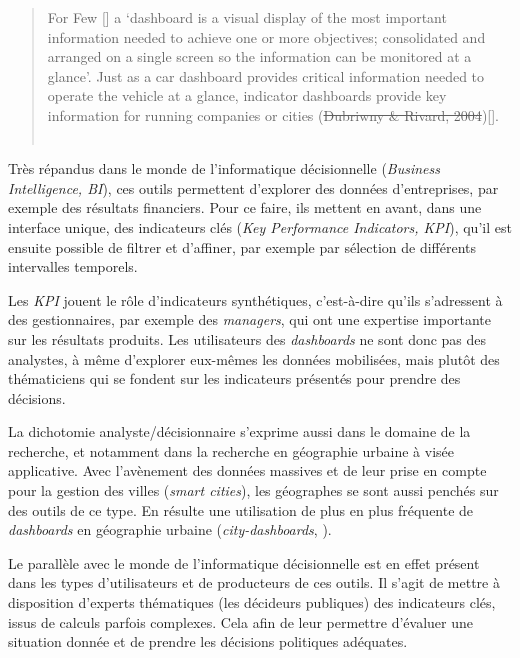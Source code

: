 	\begin{quotation}
		\og For Few [\autocite[p.34]{few_information_2006}] a ‘dashboard is
		a visual display of the most important information needed to achieve one or more objectives; consolidated and arranged on a single screen so the information can be monitored at a glance’.
		Just as a car dashboard provides critical information needed to operate the vehicle at a glance, indicator dashboards provide key information for running companies or cities (\st{Dubriwny \& Rivard, 2004})[\autocite{rivard_are_2004}].\fg{}\\
		\mbox{}~ \hfill \cite[p. 11]{kitchin_knowing_2015}
	\end{quotation}

	Très répandus dans le monde de l'informatique décisionnelle (\textit{Business Intelligence, BI}), ces outils permettent d'explorer des données d'entreprises, par exemple des résultats financiers.
	Pour ce faire, ils mettent en avant, dans une interface unique, des indicateurs clés (\textit{Key Performance Indicators, KPI}), qu'il est ensuite possible de filtrer et d'affiner, par exemple par sélection de différents intervalles temporels.

	Les \textit{KPI} jouent le rôle d'indicateurs synthétiques, c'est-à-dire qu'ils s'adressent à des gestionnaires, par exemple des \textit{managers}, qui ont une expertise importante sur les résultats produits.
	Les utilisateurs des \textit{dashboards} ne sont donc pas des analystes, à même d'explorer eux-mêmes les données mobilisées, mais plutôt des thématiciens qui se fondent sur les indicateurs présentés pour prendre des décisions.

	La dichotomie \og analyste/décisionnaire\fg{} s'exprime aussi dans le domaine de la recherche, et notamment dans la recherche en géographie urbaine à visée applicative.
	Avec l'avènement des données massives et de leur prise en compte pour la gestion des villes (\textit{smart cities}), les géographes se sont aussi penchés sur des outils de ce type.
	En résulte une utilisation de plus en plus fréquente de \textit{dashboards} en géographie urbaine (\og \textit{city-dashboards}\fg{}, \cite{roumpani_creating_2013, kitchin_knowing_2015, batty_perspective_2015}).

	Le parallèle avec le monde de l'informatique décisionnelle est en effet présent dans les types d'utilisateurs et de producteurs de ces outils.
	Il s'agit de mettre à disposition d'experts thématiques (les décideurs publiques) des indicateurs clés, issus de calculs parfois complexes.
	Cela afin de leur permettre d'évaluer une situation donnée et de prendre les décisions politiques adéquates.

